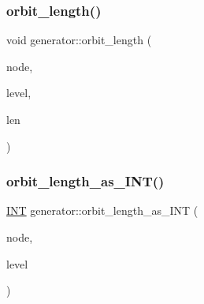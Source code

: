 \mbox{\label{classgenerator_ac16b238e15948a3f551dfa5b5acbbdf6}} 
\subsubsection{\texorpdfstring{orbit\+\_\+length()}{orbit\_length()}}
{\footnotesize\ttfamily void generator\+::orbit\+\_\+length (\begin{DoxyParamCaption}\item[{\mbox{\hyperlink{galois_8h_a09fddde158a3a20bd2dcadb609de11dc}{I\+NT}}}]{node,  }\item[{\mbox{\hyperlink{galois_8h_a09fddde158a3a20bd2dcadb609de11dc}{I\+NT}}}]{level,  }\item[{\mbox{\hyperlink{classlonginteger__object}{longinteger\+\_\+object}} \&}]{len }\end{DoxyParamCaption})}

\mbox{\label{classgenerator_ad1925110f84924f3e3871f6f972cee4d}} 
\subsubsection{\texorpdfstring{orbit\+\_\+length\+\_\+as\+\_\+\+I\+N\+T()}{orbit\_length\_as\_INT()}}
{\footnotesize\ttfamily \mbox{\hyperlink{galois_8h_a09fddde158a3a20bd2dcadb609de11dc}{I\+NT}} generator\+::orbit\+\_\+length\+\_\+as\+\_\+\+I\+NT (\begin{DoxyParamCaption}\item[{\mbox{\hyperlink{galois_8h_a09fddde158a3a20bd2dcadb609de11dc}{I\+NT}}}]{node,  }\item[{\mbox{\hyperlink{galois_8h_a09fddde158a3a20bd2dcadb609de11dc}{I\+NT}}}]{level }\end{DoxyParamCaption})}

\mbox{\label{classgenerator_aa1ae9d8cbaa9d7012e7796499e4c93e9}} 
